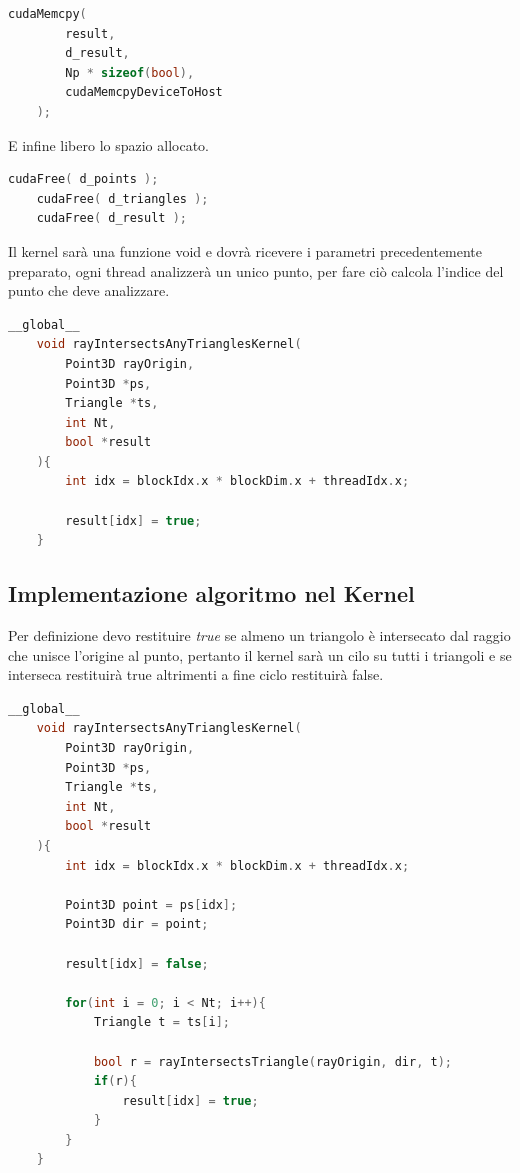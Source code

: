 \documentclass[a4paper]{article}
\begin{document}
\begin{lstlisting}[language=c++]
    cudaMemcpy(
        result, 
        d_result, 
        Np * sizeof(bool),
        cudaMemcpyDeviceToHost
    );
\end{lstlisting}

E infine libero lo spazio allocato.

\begin{lstlisting}[language=c++]
    cudaFree( d_points );
    cudaFree( d_triangles );
    cudaFree( d_result );
\end{lstlisting}


Il kernel sarà una funzione void e dovrà ricevere i parametri precedentemente preparato, ogni thread analizzerà un unico punto, per fare ciò calcola l'indice del punto che deve analizzare.

\begin{lstlisting}[language=c++]
    __global__
    void rayIntersectsAnyTrianglesKernel(
        Point3D rayOrigin, 
        Point3D *ps,
        Triangle *ts,
        int Nt,
        bool *result
    ){
        int idx = blockIdx.x * blockDim.x + threadIdx.x;

        result[idx] = true;
    }
\end{lstlisting}

\newpage

\subsection{Implementazione algoritmo nel Kernel}

Per definizione devo restituire \emph{true} se almeno un triangolo è intersecato dal raggio che unisce l'origine al punto, pertanto il kernel sarà un cilo su tutti i triangoli e se interseca restituirà true altrimenti a fine ciclo restituirà false.

\begin{lstlisting}[language=c++]
    __global__
    void rayIntersectsAnyTrianglesKernel(
        Point3D rayOrigin, 
        Point3D *ps,
        Triangle *ts,
        int Nt,
        bool *result
    ){
        int idx = blockIdx.x * blockDim.x + threadIdx.x;

        Point3D point = ps[idx];
        Point3D dir = point;

        result[idx] = false;
        
        for(int i = 0; i < Nt; i++){
            Triangle t = ts[i];
            
            bool r = rayIntersectsTriangle(rayOrigin, dir, t);
            if(r){
                result[idx] = true;
            }
        }	
    }
\end{lstlisting}
\end{document}
